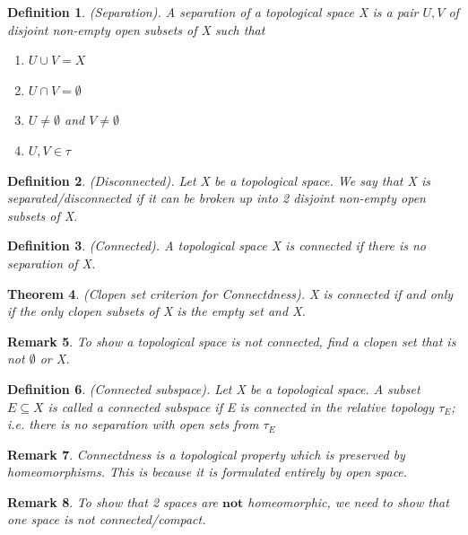 \documentclass[twoside]{article}
\newcounter{lecnum}
\newtheorem{theorem}{Theorem}[lecnum]
\newtheorem{definition}[theorem]{Definition}
\newtheorem{remark}[theorem]{Remark}
\begin{document}
\begin{definition}(Separation). A separation of a topological space X is a pair $U, V$ of disjoint non-empty open subsets of X such that
\begin{enumerate}
\item $U \cup V = X$
\item $U \cap V = \emptyset$
\item $U \neq \emptyset$ and $V \neq \emptyset$ 
\item $U, V \in \tau$
\end{enumerate}
\end{definition}
\begin{definition}(Disconnected). Let X be a topological space. We say that X is separated/disconnected if it can be broken up into 2 disjoint non-empty open subsets of X.
\end{definition}

\begin{definition}(Connected). A topological space X is connected if there is no separation of X.
\end{definition}

\begin{theorem}(Clopen set criterion for Connectdness). X is connected if and only if the only clopen subsets of X is the empty set and X.
\end{theorem}

\begin{remark}To show a topological space is not connected, find a clopen set that is not $\emptyset$ or X.
\end{remark}

\begin{definition}(Connected subspace). Let X be a topological space. A subset $E \subseteq X$ is called a connected subspace if E is connected in the relative topology $\tau_E$; i.e. there is no separation with open sets from $\tau_E$
\end{definition}

\begin{remark}Connectdness is a topological property which is preserved by homeomorphisms. This is because it is formulated entirely by open space.
\end{remark}

\begin{remark}To show that 2 spaces are $\textbf{not}$ homeomorphic, we need to show that one space is not connected/compact.
\end{remark}
\end{document}
